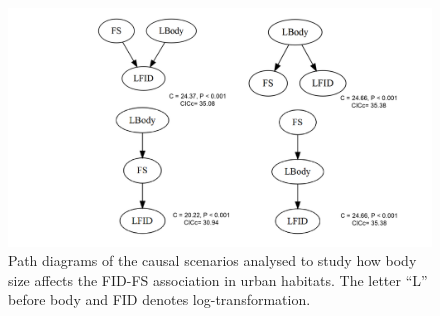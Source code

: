 \begin{figure}
\includegraphics[width=\textwidth]{./Figures/Appendix4_1/Fig_3.png}
\caption[Path analysis with body size for urban habitats]{
Path diagrams of the causal scenarios analysed to study how body size affects
the FID-FS association in urban habitats. The letter “L” before body and
FID denotes log-transformation.}\label{fig:figApp4.1.3}
\end{figure}
